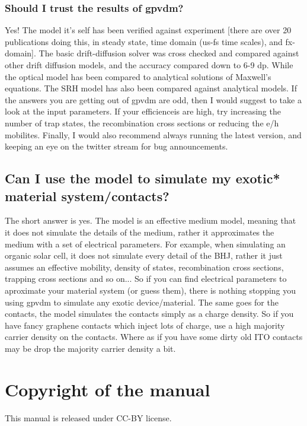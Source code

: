 \subsubsection{Should I trust the results of gpvdm?}
Yes!  The model it's self has been verified against experiment [there are over 20 publications doing this, in steady state, time domain (us-fs time scales), and fx-domain]. The basic drift-diffusion solver was cross checked and compared against other drift diffusion models, and the accuracy compared down to 6-9 dp.  While the optical model has been compared to analytical solutions of Maxwell's equations.  The SRH model has also been compared against analytical models.  If the answers you are getting out of gpvdm are odd, then I would suggest to take a look at the input parameters.  If your efficienceis are high, try increasing the number of trap states, the recombination cross sections or reducing the e/h mobilites.  Finally, I would also recommend always running the latest version, and keeping an eye on the twitter stream for bug announcements.



\subsection{Can I use the model to simulate my exotic* material system/contacts?}
The short answer is yes.  The model is an effective medium model, meaning that it does not simulate the details of the medium, rather it approximates the medium with a set of electrical parameters.  For example, when simulating an organic solar cell, it does not simulate every detail of the BHJ, rather it just assumes an effective mobility, density of states, recombination cross sections, trapping cross sections and so on...  So if you can find electrical parameters to aproximate your material system (or guess them), there is nothing stopping you using gpvdm to simulate any exotic device/material.  The same goes for the contacts, the model simulates the contacts simply as a charge density. So if you have fancy graphene contacts which inject lots of charge, use a high majority carrier density on the contacts.  Where as if you have some dirty old ITO contacts may be drop the majority carrier density a bit.

\newpage





\newpage
\section{Copyright of the manual}
This manual is released under CC-BY license.

